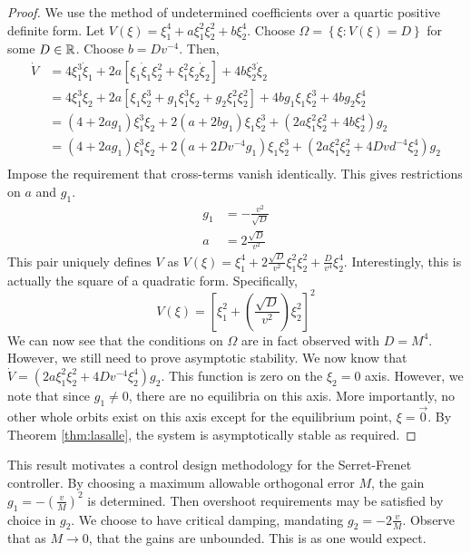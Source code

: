 \documentclass[oneside, 11pt]{book}
\begin{document}
\begin{proof}
    We use the method of undetermined coefficients over a quartic positive definite form. Let $V(\xi) = \xi_1^4 + a\xi_1^2\xi_2^2 + b\xi_2^4$. Choose $\Omega=\left\{\xi : V(\xi) = D\right\}$ for some $D\in\mathbb{R}$. Choose $b=Dv^{-4}$. Then,
    \begin{align*}
        \dot{V} &=  4\xi_1^3\dot{\xi}_1 + 2a\left[\xi_1\dot{\xi}_1\xi_2^2 + \xi_1^2\xi_2\dot{\xi}_2\right] + 4b\xi_2^3\dot{\xi}_2\\
                &=  4\xi_1^3\xi_2 + 2a\left[\xi_1\xi_2^3 + g_1\xi_1^3\xi_2 + g_2\xi_1^2\xi_2^2\right] + 4bg_1\xi_1\xi_2^3 + 4bg_2\xi_2^4\\
                &=  \left(4+2ag_1\right)\xi_1^3\xi_2 + 2\left(a + 2bg_1\right)\xi_1\xi_2^3 + \left(2a\xi_1^2\xi_2^2 + 4b\xi_2^4\right)g_2\\
                &=  \left(4+2ag_1\right)\xi_1^3\xi_2 + 2\left(a + 2Dv^{-4}g_1\right)\xi_1\xi_2^3 + \left(2a\xi_1^2\xi_2^2 + 4Dvd^{-4}\xi_2^4\right)g_2\\
    \end{align*}
    Impose the requirement that cross-terms vanish identically. This gives restrictions on $a$ and $g_1$.
    \begin{align*}
        g_1 &= -\frac{v^2}{\sqrt{D}}\\
        a &= 2\frac{\sqrt{D}}{v^2}
    \end{align*}
    This pair uniquely defines $V$ as $V(\xi) = \xi_1^4 + 2\frac{\sqrt{D}}{v^2}\xi_1^2\xi_2^2 + \frac{D}{v^4}\xi_2^4$. Interestingly, this is actually the square of a quadratic form. Specifically,
    $$
        V(\xi) = \left[\xi_1^2 + \left(\frac{\sqrt{D}}{v^2}\right)\xi_2^2 \right]^2
    $$
    We can now see that the conditions on $\Omega$ are in fact observed with $D = M^4$. However, we still need to prove asymptotic stability. We now know that $\dot{V} = \left(2a\xi_1^2\xi_2^2 + 4Dv^{-4}\xi_2^4\right)g_2$. This function is zero on the $\xi_2=0$ axis. However, we note that since $g_1 \neq 0$, there are no equilibria on this axis. More importantly, no other whole orbits exist on this axis except for the equilibrium point, $\xi=\vec{0}$. By Theorem \ref{thm:lasalle}, the system is asymptotically stable as required.
\end{proof}
This result motivates a control design methodology for the Serret-Frenet controller. By choosing a maximum allowable orthogonal error $M$, the gain $g_1 = -(\frac{v}{M})^2$ is determined. Then overshoot requirements may be satisfied by choice in $g_2$. We choose to have critical damping, mandating $g_2 = -2\frac{v}{M}$. Observe that as $M\to 0$, that the gains are unbounded. This is as one would expect.
\end{document}
